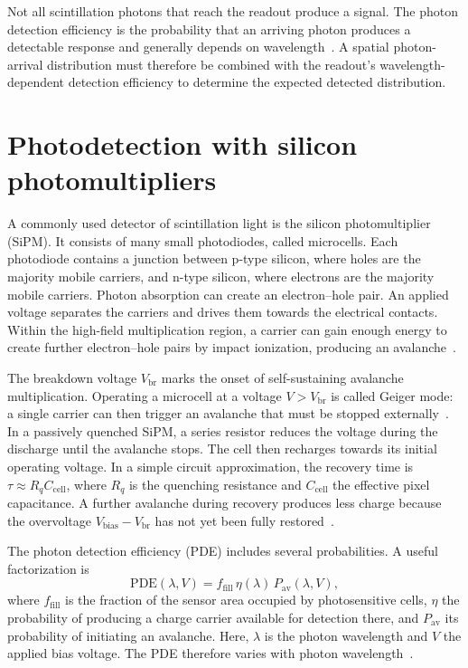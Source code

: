 Not all scintillation photons that reach the readout produce a signal. The photon detection efficiency is the probability that an arriving photon produces a detectable response and generally depends on wavelength~\parencite{eckert2010characterisation}. A spatial photon-arrival distribution must therefore be combined with the readout's wavelength-dependent detection efficiency to determine the expected detected distribution.

\section{Photodetection with silicon photomultipliers}

A commonly used detector of scintillation light is the silicon photomultiplier (SiPM). It consists of many small photodiodes, called microcells. Each photodiode contains a junction between p-type silicon, where holes are the majority mobile carriers, and n-type silicon, where electrons are the majority mobile carriers. Photon absorption can create an electron--hole pair. An applied voltage separates the carriers and drives them towards the electrical contacts. Within the high-field multiplication region, a carrier can gain enough energy to create further electron--hole pairs by impact ionization, producing an avalanche~\parencite{piatek2014sipm}.

The breakdown voltage $V_{\mathrm{br}}$ marks the onset of self-sustaining avalanche multiplication. Operating a microcell at a voltage $V>V_{\mathrm{br}}$ is called Geiger mode: a single carrier can then trigger an avalanche that must be stopped externally~\parencite{piatek2014sipm}.
In a passively quenched SiPM, a series resistor reduces the voltage during the discharge until the avalanche stops. The cell then recharges towards its initial operating voltage. In a simple circuit approximation, the recovery time is $\tau\approx R_q C_{\mathrm{cell}}$, where $R_q$ is the quenching resistance and $C_{\mathrm{cell}}$ the effective pixel capacitance. A further avalanche during recovery produces less charge because the overvoltage $V_{\mathrm{bias}}-V_{\mathrm{br}}$ has not yet been fully restored~\parencite{eckert2012response}.

The photon detection efficiency (PDE) includes several probabilities. A useful factorization is
\begin{equation}
  \mathrm{PDE}(\lambda,V)=f_{\mathrm{fill}}\,\eta(\lambda)\,P_{\mathrm{av}}(\lambda,V),
\end{equation}
where $f_{\mathrm{fill}}$ is the fraction of the sensor area occupied by photosensitive cells, $\eta$ the probability of producing a charge carrier available for detection there, and $P_{\mathrm{av}}$ its probability of initiating an avalanche. Here, $\lambda$ is the photon wavelength and $V$ the applied bias voltage. The PDE therefore varies with photon wavelength~\parencite{eckert2010characterisation}.

